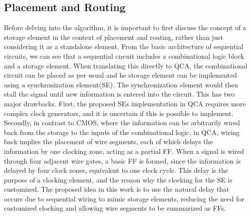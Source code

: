 \subsection{Placement and Routing}
Before delving into the algorithm, it is important to first discuss the concept of a storage element in the context of placement and routing, rather than just considering it as a standalone element. From the basic architecture of sequential circuits, we can see that a sequential circuit includes a combinational logic block and a storage element. When translating this directly to QCA, the combinational circuit can be placed as per usual and he storage element can be implemented using a synchronization element(SE). The synchronization element would then stall the signal until new information is entered into the circuit. This has two major drawbacks. First, the proposed SEs implementation in QCA requires more complex clock generators, and it is uncertain if this is possible to implement. Secondly, in contrast to CMOS, where the information can be arbitrarily wired back from the storage to the inputs of the combinational logic, in QCA, wiring back implies the placement of wire segments, each of which delays the information by one clocking zone, acting as a partial FF. When a signal is wired through four adjacent wire gates, a basic FF is formed, since the information is delayed by four clock zones, equivalent to one clock cycle. This delay is the purpose of a clocking element, and the reason why the clocking for the SE is customized. The proposed idea in this work is to use the natural delay that occurs due to sequential wiring to mimic storage elements, reducing the need for customized clocking and allowing wire segments to be summarized as FFs.

